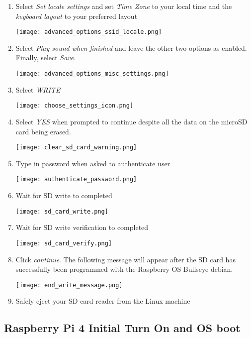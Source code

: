 \documentclass[journal]{IEEEtran}
\begin{document}
\begin{enumerate}
        \item Select \emph{Set locale settings} and set \emph{Time Zone} to your local time and the \emph{keyboard layout} to your preferred layout
        
        \texttt{[image: advanced\_options\_ssid\_locale.png]}

        \item Select \emph{Play sound when finished} and leave the other two options as enabled. Finally, select \emph{Save}.
        
        \texttt{[image: advanced\_options\_misc\_settings.png]}

        \item Select \emph{WRITE} 
        
        \texttt{[image: choose\_settings\_icon.png]}

        \item Select \emph{YES} when prompted to continue despite all the data on the microSD card being erased.
        
        \texttt{[image: clear\_sd\_card\_warning.png]}

        \item Type in password when asked to authenticate user
        
        \texttt{[image: authenticate\_password.png]}

        \item Wait for SD write to completed
        
        \texttt{[image: sd\_card\_write.png]}

        \item Wait for SD write verification to completed
        
        \texttt{[image: sd\_card\_verify.png]}

        \item Click \emph{continue}. The following message will appear after the SD card has successfully been programmed with the Raspberry OS Bullseye debian.
        
        \texttt{[image: end\_write\_message.png]}

        \item Safely eject your SD card reader from the Linux machine 

    \end{enumerate}

    \subsection{Raspberry Pi 4 Initial Turn On and OS boot}
\end{document}
